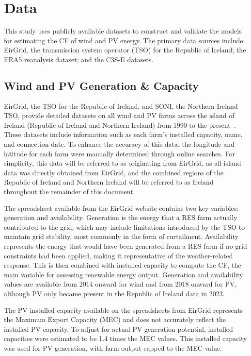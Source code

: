 \documentclass[a4paper, 11pt]{article}
\begin{document}
\section{Data}
\label{sec:Data}

This study uses publicly available datasets to construct and validate the models for estimating the CF of wind and PV energy. The primary data sources include: EirGrid, the transmission system operator (TSO) for the Republic of Ireland; the ERA5 reanalysis dataset; and the C3S-E datasets.

\subsection{Wind and PV Generation \& Capacity}
\label{sec:eirgrid}

EirGrid, the TSO for the Republic of Ireland, and SONI, the Northern Ireland TSO, provide detailed datasets on all wind and PV farms across the island of Ireland (Republic of Ireland and Northern Ireland) from 1990 to the present~\cite{eirgrid2023spreadsheet}. These datasets include information such as each farm’s installed capacity, name, and connection date. To enhance the accuracy of this data, the longitude and latitude for each farm were manually determined through online searches. For simplicity, this data will be referred to as originating from EirGrid, as all-island data was directly obtained from EirGrid, and the combined regions of the Republic of Ireland and Northern Ireland will be referred to as Ireland throughout the remainder of this document.

The spreadsheet available from the EirGrid website contains two key variables: generation and availability. Generation is the energy that a RES farm actually contributed to the grid, which may include limitations introduced by the TSO to maintain grid stability, most commonly in the form of curtailment. Availability represents the energy that would have been generated from a RES farm if no grid constraints had been applied, making it representative of the weather-related response. This is then combined with installed capacity to compute the CF, the main variable for assessing renewable energy output. Generation and availability values are available from 2014 onward for wind and from 2018 onward for PV, although PV only became present in the Republic of Ireland data in 2023.

The PV installed capacity available on the spreadsheets from EirGrid represents the Maximum Export Capacity (MEC) and does not accurately reflect the installed PV capacity. To adjust for actual PV generation potential, installed capacities were estimated to be 1.4 times the MEC values. This installed capacity was used for PV generation, with farm output capped to the MEC value.
\end{document}
